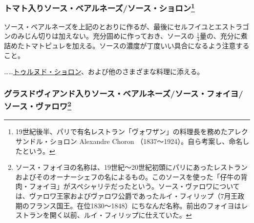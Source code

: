 \begin{recette}
\atoaki{}

\hypertarget{sauce-bearnaise-tomatee}{%
\subsubsection[トマト入りソース・ベアルネーズ/ソース・ショロン]{\texorpdfstring{トマト入りソース・ベアルネーズ/ソース・ショロン\footnote{19世紀後半、パリで有名レストラン「ヴォワザン」の料理長を務めたアレクサンドル・ショロン
  Alexandre Choron （1837〜1924）。自ら考案し、命名したという。}}{トマト入りソース・ベアルネーズ/ソース・ショロン}}\label{sauce-bearnaise-tomatee}}


 

ソース・ベアルネーズを上記のとおりに作るが、最後にセルフイユとエストラゴンのみじん切りは加えない。充分固めに作っておき、ソースの
\(\frac{1}{4}\)量の、充分に煮詰めたトマトピュレを加える。ソースの濃度が丁度いい具合になるよう注意すること。

\ldots{}\ldots{}\protect\hyperlink{tournedos-choron}{トゥルヌド・ショロン}、および他のさまざまな料理に添える。

\atoaki{}

\hypertarget{sauce-bearnaise-a-la-glace-de-viande}{%
\subsubsection[グラスドヴィアンド入りソース・ベアルネーズ/ソース・フォイヨ/ソース・ヴァロワ]{\texorpdfstring{グラスドヴィアンド入りソース・ベアルネーズ/ソース・フォイヨ/ソース・ヴァロワ\footnote{ソース・フォイヨの名称は、19世紀〜20世紀初頭にパリにあったレストランおよびそのオーナーシェフの名によるもの。このソースを使った「仔牛の背肉・フォイヨ」がスペシャリテだったという。ソース・ヴァロワについては、ヴァロワ王家およびヴァロワ公爵であったルイ・フィリップ（7月王政期のフランス国王。在位1830〜1848）にちなんだ名称。前出のフォイヨはレストランを開く以前、ルイ・フィリップに仕えていた。}}{グラスドヴィアンド入りソース・ベアルネーズ/ソース・フォイヨ/ソース・ヴァロワ}}\label{sauce-bearnaise-a-la-glace-de-viande}}


\end{recette}
